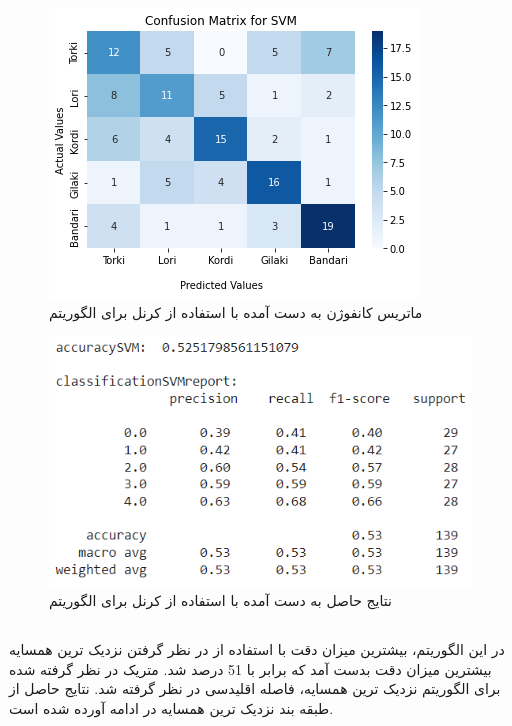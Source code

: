 \newpage

\begin{figure}[h!]
	\centering
	\includegraphics[width=1\linewidth]{images/svm_rbf_confusion_matrix.png}
	\caption{ماتریس کانفوژن به دست آمده با استفاده از کرنل  برای الگوریتم }
	\label{fig:svm_rbf_confusion_matrix}
\end{figure}

\begin{figure}[h!]
	\centering
	\includegraphics[width=1\linewidth]{images/svm_rbf_scores.PNG}
	\caption{نتایج حاصل به دست آمده با استفاده از کرنل  برای الگوریتم }
	\label{fig:svm_rbf_scores}
\end{figure}

\newpage

\subsection{}
در این الگوریتم، بیشترین میزان دقت با استفاده از در نظر گرفتن نزدیک ترین همسایه بیشترین میزان دقت بدست آمد که برابر با 51 درصد شد. 
متریک در نظر گرفته شده برای الگوریتم نزدیک ترین همسایه، فاصله اقلیدسی در نظر گرفته شد.
نتایج حاصل از طبقه بند نزدیک ترین همسایه در ادامه آورده شده است.

